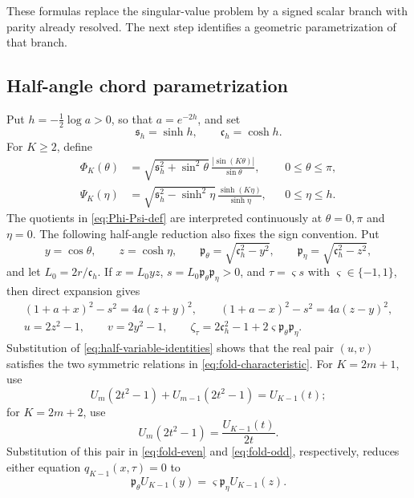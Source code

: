 \documentclass[11pt,a4paper]{article}
\numberwithin{equation}{section}
\begin{document}
These formulas replace the singular-value problem by a signed scalar branch
with parity already resolved.  The next step identifies a geometric
parametrization of that branch.

\subsection{Half-angle chord parametrization}
\label{subsec:half-angle-chords}
Put \(h=-\tfrac12\log a>0\), so that \(a=e^{-2h}\), and set
\[
 \mathfrak s_h=\sinh h,\qquad \mathfrak c_h=\cosh h.
\]
For \(K\geq2\), define
\begin{equation}\label{eq:Phi-Psi-def}
\begin{aligned}
 \Phi_K(\theta)
 &=\sqrt{\mathfrak s_h^2+\sin^2\theta}\,
   \frac{|\sin(K\theta)|}{\sin\theta},
   &&0\leq\theta\leq\pi,\\
 \Psi_K(\eta)
 &=\sqrt{\mathfrak s_h^2-\sinh^2\eta}\,
   \frac{\sinh(K\eta)}{\sinh\eta},
   &&0\leq\eta\leq h.
\end{aligned}
\end{equation}
The quotients in \eqref{eq:Phi-Psi-def} are interpreted continuously at
\(\theta=0,\pi\) and \(\eta=0\).  The following half-angle reduction also
fixes the sign convention.  Put
\[
 y=\cos\theta,\qquad z=\cosh\eta,\qquad
 \mathfrak p_\theta=\sqrt{\mathfrak c_h^2-y^2},\qquad
 \mathfrak p_\eta=\sqrt{\mathfrak c_h^2-z^2},
\]
and let \(L_0=2r/\mathfrak c_h\).  If
\(x=L_0yz\), \(s=L_0\mathfrak p_\theta\mathfrak p_\eta>0\), and
\(\tau=\varsigma s\) with \(\varsigma\in\{-1,1\}\), then direct
expansion gives
\begin{equation}\label{eq:half-variable-identities}
\begin{gathered}
 (1+a+x)^2-s^2=4a(z+y)^2,\qquad
 (1+a-x)^2-s^2=4a(z-y)^2,\\
 u=2z^2-1,\qquad v=2y^2-1,\qquad
 \zeta_\tau=2\mathfrak c_h^2-1
 +2\varsigma\mathfrak p_\theta\mathfrak p_\eta.
\end{gathered}
\end{equation}
Substitution of \eqref{eq:half-variable-identities} shows that the real pair
\((u,v)\) satisfies the two symmetric relations in
\eqref{eq:fold-characteristic}.
For \(K=2m+1\), use
\[
 U_m(2t^2-1)+U_{m-1}(2t^2-1)=U_{K-1}(t);
\]
for \(K=2m+2\), use
\[
 U_m(2t^2-1)=\frac{U_{K-1}(t)}{2t}.
\]
Substitution of this pair in \eqref{eq:fold-even} and
\eqref{eq:fold-odd}, respectively, reduces either equation
\(q_{K-1}(x,\tau)=0\) to
\begin{equation}\label{eq:signed-half-chord}
 \mathfrak p_\theta U_{K-1}(y)
 =\varsigma\mathfrak p_\eta U_{K-1}(z).
\end{equation}
\end{document}

